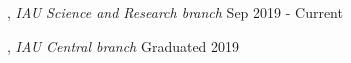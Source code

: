 
, \textit{IAU Science and Research branch}	\hfill Sep 2019 - Current 

, \textit{IAU Central branch} \hfill	Graduated 2019

